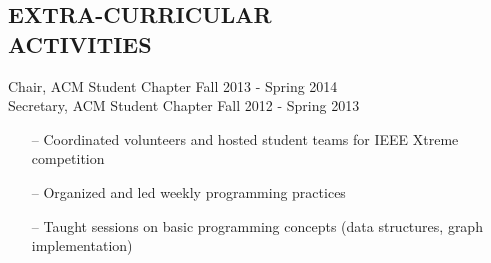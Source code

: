 \documentclass[line,margin]{res}
\begin{document}
\begin{resume}
\section{EXTRA-CURRICULAR \\ ACTIVITIES}             
	
%
%	
%		

		
		
		Chair, ACM Student Chapter \hfill Fall 2013 - Spring 2014\\
		Secretary, ACM Student Chapter \hfill Fall 2012 - Spring 2013 
		         \begin{itemize} [leftmargin=5mm]  \itemsep -2pt %
                 \item[--] Coordinated volunteers and hosted student teams for IEEE Xtreme competition 
                 \item[--] Organized and led weekly programming practices
                 \item[--] Taught sessions on basic programming concepts (data structures, graph implementation)
                 \end{itemize} 


\end{resume}
\end{document}
